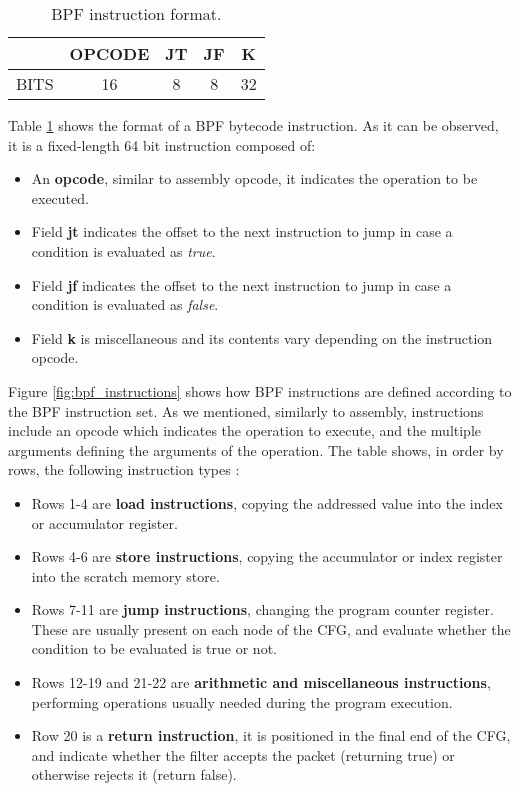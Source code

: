 \begin{table}[htbp]
\begin{tabular}{|c|c|c|c|c|}
\hline
& OPCODE & JT & JF & K\\
\hline
BITS & 16 & 8 & 8 & 32\\
\hline
\end{tabular}
\caption{BPF instruction format.}
\label{table:bpf_inst_format}
\end{table}

Table \ref{table:bpf_inst_format} shows the format of a BPF bytecode instruction. As it can be observed, it is a fixed-length 64 bit instruction composed of:
\begin{itemize}
\item An \textbf{opcode}, similar to assembly opcode, it indicates the operation to be executed.
\item Field \textbf{jt} indicates the offset to the next instruction to jump in case a condition is evaluated as \textit{true}.
\item Field \textbf{jf} indicates the offset to the next instruction to jump in case a condition is evaluated as \textit{false}.
\item Field \textbf{k} is miscellaneous and its contents vary depending on the instruction opcode.
\end{itemize}

Figure \ref{fig:bpf_instructions} shows how BPF instructions are defined according to the BPF instruction set. As we mentioned, similarly to assembly, instructions include an opcode which indicates the operation to execute, and the multiple arguments defining the arguments of the operation. The table shows, in order by rows, the following instruction types \cite{bpf_bsd_origin_bpf_page8}:
\begin{itemize}
\item Rows 1-4 are \textbf{load instructions}, copying the addressed value into the index or accumulator register.
\item Rows 4-6 are \textbf{store instructions}, copying the accumulator or index register into the scratch memory store.
\item Rows 7-11 are \textbf{jump instructions}, changing the program counter register. These are usually present on each node of the CFG, and evaluate whether the condition to be evaluated is true or not.
\item Rows 12-19 and 21-22 are \textbf{arithmetic and miscellaneous instructions}, performing operations usually needed during the program execution.
\item Row 20 is a \textbf{return instruction}, it is positioned in the final end of the CFG, and indicate whether the filter accepts the packet (returning true) or otherwise rejects it (return false).
\end{itemize}


